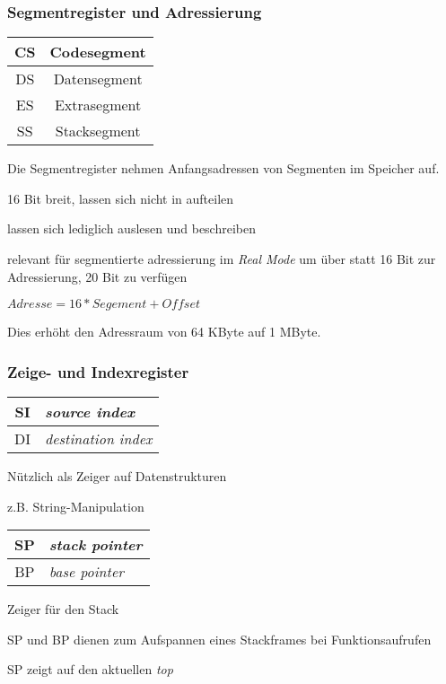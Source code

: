 \subsubsection{Segmentregister und Adressierung}

\begin{tabular}{|c|c|}
\hline CS & Codesegment \\
\hline DS & Datensegment \\
\hline ES & Extrasegment\\
\hline SS & Stacksegment \\
\hline
\end{tabular}

Die Segmentregister nehmen Anfangsadressen von Segmenten im Speicher auf.

16 Bit breit, lassen sich nicht in aufteilen

lassen sich lediglich auslesen und beschreiben

relevant für segmentierte adressierung im \emph{Real Mode} um über statt 16 Bit
zur Adressierung, 20 Bit zu verfügen

$Adresse = 16 * Segement + Offset$

Dies erhöht den Adressraum von 64 KByte auf 1 MByte.



\subsubsection{Zeige- und Indexregister}

\begin{tabular}{|c|l|}
\hline SI & \emph{source index} \\
\hline DI & \emph{destination index} \\
\hline
\end{tabular}

Nützlich als Zeiger auf Datenstrukturen

z.B. String-Manipulation


\begin{tabular}{|c|l|}
\hline SP & \emph{stack pointer}\\
\hline BP & \emph{base pointer} \\
\hline
\end{tabular}

Zeiger für den Stack

SP und BP dienen zum Aufspannen eines Stackframes bei Funktionsaufrufen

SP zeigt auf den aktuellen \emph{top}

